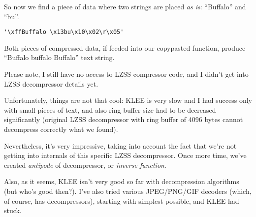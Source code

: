So now we find a piece of data where two strings are placed \textit{as is}: ``Buffalo'' and ``bu''.

\begin{lstlisting}
'\xffBuffalo \x13bu\x10\x02\r\x05'
\end{lstlisting}

Both pieces of compressed data, if feeded into our copypasted function, produce ``Buffalo buffalo Buffalo'' text string.

Please note, I still have no access to LZSS compressor code, and I didn't get into LZSS decompressor details yet.

Unfortunately, things are not that cool: 
KLEE is very slow and I had success only with small pieces of text, and also ring buffer size had to be decreased significantly
(original LZSS decompressor with ring buffer of 4096 bytes cannot decompress correctly what we found).

Nevertheless, it's very impressive, taking into account the fact that we're not getting into internals of this specific LZSS decompressor.
Once more time, we've created \textit{antipode} of decompressor, or \textit{inverse function}.

Also, as it seems, KLEE isn't very good so far with decompression algorithms (but who's good then?).
I've also tried various JPEG/PNG/GIF decoders (which, of course, has decompressors), starting with simplest possible, and KLEE had stuck.


